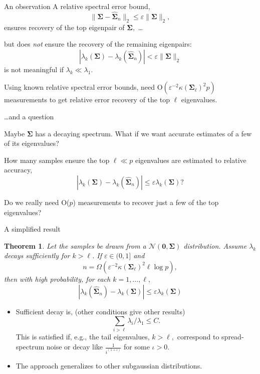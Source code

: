 \documentclass[xcolor={svgnames,pdftex,dvipsnames,table},10pt]{beamer} %
\newcommand{\mat}[1]{\ensuremath{\mathbf{#1}}}
\newtheorem*{thm}{Theorem}
\begin{document}
\begin{frame}{An observation}
A relative spectral error bound,
\[
\|\mat{\Sigma} - \widehat{\mat{\Sigma}}_n\|_2 \leq \varepsilon \|\mat{\Sigma}\|_2,
\]
ensures recovery of the top eigenpair of $\mat{\Sigma},$ \ldots

\vspace{1em}
\pause
but does \emph{not} ensure the recovery of the remaining eigenpairs:
\[
|\lambda_k(\mat{\Sigma}) - \lambda_k(\widehat{\mat{\Sigma}}_n)| < \varepsilon \|\mat{\Sigma}\|_2 
\]
is not meaningful if $\lambda_k \ll \lambda_1.$

\vspace{1em}
\pause
Using known relative spectral error bounds, need O$(\varepsilon^{-2} \kappa(\mat{\Sigma}_\ell)^2 p)$ measurements to get relative error recovery of the top $\ell$ eigenvalues.
\end{frame}

\begin{frame}{\dots and a question}

Maybe $\mat{\Sigma}$ has a decaying spectrum.
What if we want accurate estimates of a few of its eigenvalues?
\vspace{1em}
\begin{displaybox}{0.7\textwidth}
\parbox{\textwidth}{%
How many samples ensure the top $\ell \ll p$ eigenvalues are estimated to relative accuracy,
\[
|\lambda_k(\mat{\Sigma}) - \lambda_k(\widehat{\mat{\Sigma}}_n)| \leq \varepsilon \lambda_k(\mat{\Sigma})?
\]
}
\end{displaybox}

\vspace{1em}
Do we really need O($p$) measurements to recover just a few of the top eigenvalues?

\end{frame}

\begin{frame}{A simplified result}

\begin{thm}
Let the samples be drawn from a $\mathcal{N}(\mat{0}, \mat{\Sigma})$ distribution. Assume $\lambda_k$ decays sufficiently for $k > \ell$. If $\varepsilon \in (0, 1]$ and 
\[
n = \Omega(\varepsilon^{-2} \kappa(\mat{\Sigma}_\ell)^2 \ell \log p),
\]
then with high probability, for each $k=1,\ldots,\ell,$
\[
|\lambda_k(\widehat{\mat{\Sigma}}_n) - \lambda_k(\mat{\Sigma})| \leq \varepsilon \lambda_k(\mat{\Sigma}) 
\]
\end{thm}

\begin{itemize}
\pause
	\item Sufficient decay is, (other conditions give other results)
	\[ \sum_{i > \ell} \lambda_i/\lambda_1 \leq C.
	\] 
	This is satisfied if, e.g., the tail eigenvalues, $k > \ell,$ correspond to spread-spectrum noise or decay like $\tfrac{1}{i^{(1+\iota)}
	}$ for some $\iota > 0.$
	\pause
	\item The approach generalizes to other subgaussian distributions.
\end{itemize}

\end{frame}
\end{document}
